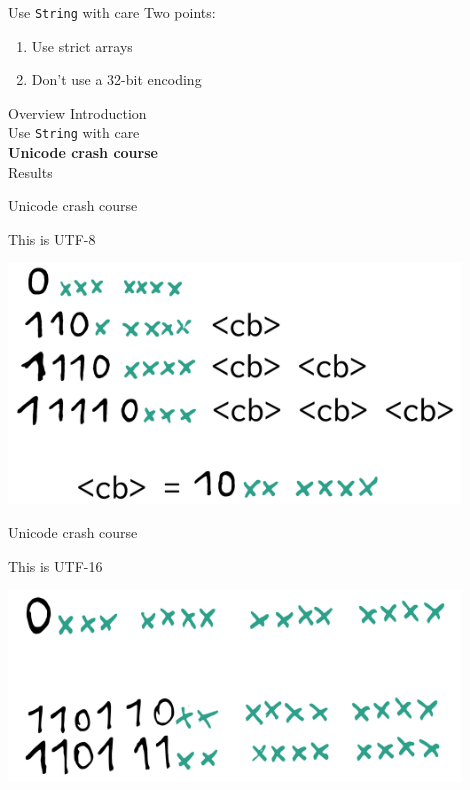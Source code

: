 \documentclass[20pt]{beamer}
\newcommand{\vspaced}{
    \vspace{5mm}
}
\begin{document}
\begin{frame}{Use \texttt{String} with care}
    Two points: \\
    \begin{enumerate}
    \item Use strict arrays
    \item Don't use a 32-bit encoding
    \end{enumerate}
\end{frame}


\begin{frame}{Overview}
    Introduction \\
    Use \texttt{String} with care \\
    \textbf{Unicode crash course} \\
    Results \\
\end{frame}

\begin{frame}{Unicode crash course}
    \begin{center}
    This is UTF-8 \\
    \vspaced
    \includegraphics[width=0.9\textwidth]{../2011-dutchhug-text-utf8/images/utf8.pdf}
    \end{center}
\end{frame}

\begin{frame}{Unicode crash course}
    \begin{center}
    This is UTF-16 \\
    \vspaced
    \includegraphics[width=0.9\textwidth]{../2011-dutchhug-text-utf8/images/utf16.pdf}
    \end{center}
\end{frame}
\end{document}
